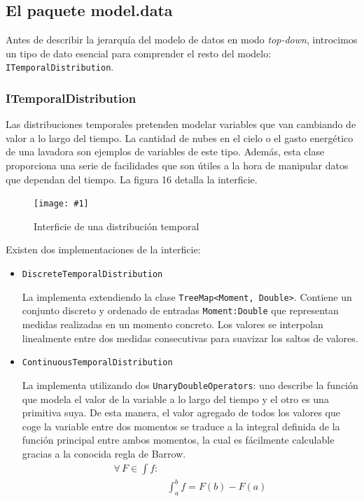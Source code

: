 \documentclass[12pt,a4paper,openright,oneside]{article}
\newcommand{\includeImage}[3]
{
	\begin{figure}[H]
	\begin{center}
	\texttt{[image: \#1]}
	\end{center}
	\caption{#3}
	\end{figure}
}
\numberwithin{equation}{section}
\theoremstyle{definition}
\begin{document}
\subsection{El paquete model.data}
Antes de describir la jerarquía del modelo de datos en modo \textit{top-down}, introcimos un tipo de dato esencial para comprender el resto del modelo: \texttt{ITemporalDistribution}.

\subsubsection{ITemporalDistribution}
Las distribuciones temporales pretenden modelar variables que van cambiando de valor a lo largo del tiempo. La cantidad de nubes en el cielo o el gasto energético de una lavadora son ejemplos de variables de este tipo. Además, esta clase proporciona una serie de facilidades que son útiles a la hora de manipular datos que dependan del tiempo. La figura 16 detalla la interficie.

\includeImage{temporal.png}{12}{Interficie de una distribución temporal}

Existen dos implementaciones de la interficie: 
\begin{itemize}
\item \texttt{DiscreteTemporalDistribution}

La implementa extendiendo la clase \texttt{TreeMap<Moment, Double>}. Contiene un conjunto discreto y ordenado de entradas \texttt{Moment:Double} que representan medidas realizadas en un momento concreto. Los valores se interpolan linealmente entre dos medidas consecutivas para suavizar los saltos de valores.  

\item \texttt{ContinuousTemporalDistribution}

La implementa utilizando dos \texttt{UnaryDoubleOperators}: uno describe la función que modela el valor de la variable a lo largo del tiempo y el otro es una primitiva suya. De esta manera, el valor agregado de todos los valores que coge la variable entre dos momentos se traduce a la integral definida de la función principal entre ambos momentos, la cual es fácilmente calculable gracias a la conocida regla de Barrow.
$$ \begin{matrix}\forall \, F \in \displaystyle\int f:& \\
 & \displaystyle\int_a^b f = F(b) - F(a) \end{matrix}$$
\end{itemize}
\end{document}
